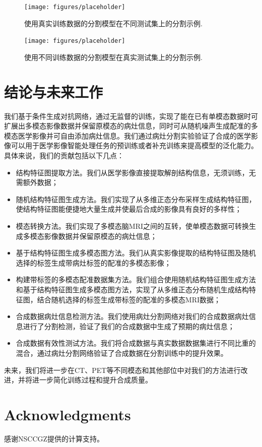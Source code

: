 \documentclass[letterpaper]{article} %
\begin{document}
\begin{figure}
	\centering
	\texttt{[image: figures/placeholder]}
	\caption{使用真实训练数据的分割模型在不同测试集上的分割示例.}
	\label{label_from_diff_test}
\end{figure}

\begin{figure}
	\centering
	\texttt{[image: figures/placeholder]}
	\caption{使用不同训练数据的分割模型在真实测试集上的分割示例.}
	\label{label_from_diff_train}
\end{figure}

\section{结论与未来工作}
我们基于条件生成对抗网络，通过无监督的训练，实现了能在已有单模态数据时可扩展出多模态影像数据并保留原模态的病灶信息，同时可从随机噪声生成配准的多模态医学影像并可自由添加病灶信息。我们通过病灶分割实验验证了合成的医学影像可以用于医学影像智能处理任务的预训练或者补充训练来提高模型的泛化能力。具体来说，我们的贡献包括以下几点：
\begin{itemize}
	\item 结构特征图提取方法。我们从医学影像直接提取解剖结构信息，无须训练，无需额外数据；
	\item 随机结构特征图生成方法。我们实现了从多维正态分布采样生成结构特征图，使结构特征图能便捷地大量生成并使最后合成的影像具有良好的多样性；
	\item 模态转换方法。我们实现了多模态脑MRI之间的互转，使单模态数据可转换生成多模态影像数据并保留原模态的病灶信息；
	\item 基于结构特征图生成多模态图方法。我们从真实影像提取的结构特征图及随机选择的标签生成带病灶标签的配准的多模态影像；
	\item 构建带标签的多模态配准数据集方法。我们组合使用随机结构特征图生成方法和基于结构特征图生成多模态图方法，实现了从多维正态分布随机生成结构特征图，结合随机选择的标签生成带标签的配准的多模态MRI数据；
	\item 合成数据病灶信息检测方法。我们使用病灶分割网络对我们的合成数据病灶信息进行了分割检测，验证了我们的合成数据中生成了预期的病灶信息；
	\item 合成数据有效性测试方法。我们将合成数据与真实数据数据集进行不同比重的混合，通过病灶分割网络验证了合成数据在分割训练中的提升效果。
\end{itemize}

未来，我们将进一步在CT、PET等不同模态和其他部位中对我们的方法进行改进，并将进一步简化训练过程和提升合成质量。	

\section{ Acknowledgments}
感谢NSCCGZ提供的计算支持。




\end{document}
